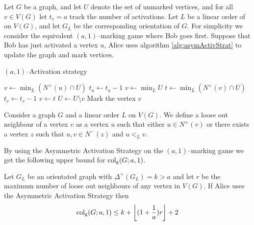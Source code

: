 
\begin{definition} 
    Let $G$ be a graph, and let $U$ denote the set of unmarked vertices, and for all $v\in V(G)$ let $t_v=a$ track the number of activations. Let $L$ be a linear order of on $V(G)$, and let $G_L$ be the corresponding orientation of $G$. %
    For simplicity we consider the equivalent $(a,1)$--marking game where Bob goes first. Suppose that Bob has just activated a vertex $u$, Alice uses algorithm \ref{alg:asymActivStrat} to update the graph and mark vertices.
    
    \begin{algorithm}[h]
        \caption{$(a,1)$--Activation strategy}
        \label{alg:asymActivStrat}
        \begin{algorithmic}[1]
            \Statex
                    \State $v\gets \min_L (N^+(u)\cap U)$ %
                    \State $t_u \gets t_u-1$
                    \Else 
                    \State $v\gets \min_L U$                  
                \EndIf
                    \State $t\gets \min_L (N^+(v)\cap U)$ %
                    \State $t_v \gets t_v-1$
                    \State $v\gets t$
                \EndWhile
                \State $U \gets U \setminus v$
                \State Mark the vertex $v$
            \EndFor
        \end{algorithmic}
    \end{algorithm}
    
    Consider a graph $G$ and a linear order $L$ on $V(G)$. We define a loose out neighbour of a vertex $v$ as a vertex $u$ such that either $u\in N^+(v)$ or there exists a vertex $z$ such that $u,v\in N^-(z)$ and $u<_L v$. 
    
    By using the Asymmetric Activation Strategy on the $(a,1)$--marking game we get the following upper bound for $\operatorname{col_g}(G;a,1)$.

    \begin{theorem}  %
        Let $G_L$ be an orientated graph with $\Delta^+(G_L)=k>a$ and let $r$ be the maximum number of loose out neighbours of any vertex in $V(G)$. If Alice uses the Asymmetric Activation Strategy then \[\operatorname{col_g}(G;a,1)\leq k+\left\lfloor (1+\frac{1}{a})r \right\rfloor +2\]
    \end{theorem}

\end{definition}



